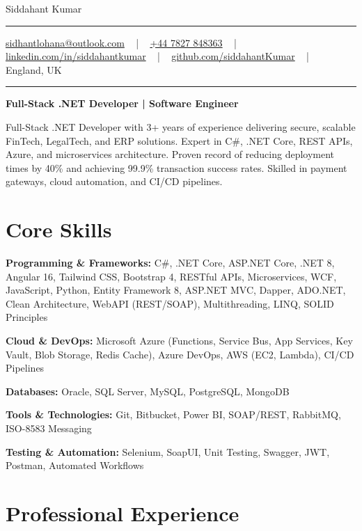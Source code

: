 \documentclass[letterpaper,10pt]{article}
\newcommand{\documentTitle}[2]{
  \begin{center}
    \vspace*{-0.3in}
    {\Huge\color{accentTitle} #1}
    \vspace{8pt}
    {\color{accentLine} \hrule}
    \vspace{2pt}
    \footnotesize{#2}
    \vspace{2pt}
    {\color{accentLine} \hrule}
  \end{center}
}
\newenvironment{resume_list}{
  \vspace{-7pt}
  \begin{itemize}[itemsep=-2px, parsep=1pt, leftmargin=30pt]
}{
  \end{itemize}
}
\begin{document}
\documentTitle{Siddahant Kumar}{
\vspace{0.1cm}
\href{mailto:sidhantlohana@outlook.com}{sidhantlohana@outlook.com} ~ | ~
\href{tel:+447827848363}{+44 7827 848363} ~ | ~
\href{https://www.linkedin.com/in/siddahantkumar/}{linkedin.com/in/siddahantkumar} ~ | ~
\href{https://github.com/siddahantKumar}{github.com/siddahantKumar} ~ | ~
England, UK
}

\begin{center}
\textbf{Full-Stack .NET Developer | Software Engineer}
\end{center}

Full-Stack .NET Developer with 3+ years of experience delivering secure, scalable FinTech, LegalTech, and ERP solutions. Expert in C\#, .NET Core, REST APIs, Azure, and microservices architecture. Proven record of reducing deployment times by 40\% and achieving 99.9\% transaction success rates. Skilled in payment gateways, cloud automation, and CI/CD pipelines.


\section{Core Skills}

\begin{resume_list}
    \item \textbf{Programming \& Frameworks:} C\#, .NET Core, ASP.NET Core, .NET 8, Angular 16, Tailwind CSS, Bootstrap 4, RESTful APIs, Microservices, WCF, JavaScript, Python, Entity Framework 8, ASP.NET MVC, Dapper, ADO.NET, Clean Architecture, WebAPI (REST/SOAP), Multithreading, LINQ, SOLID Principles
    \item \textbf{Cloud \& DevOps:} Microsoft Azure (Functions, Service Bus, App Services, Key Vault, Blob Storage, Redis Cache), Azure DevOps, AWS (EC2, Lambda), CI/CD Pipelines
    \item \textbf{Databases:} Oracle, SQL Server, MySQL, PostgreSQL, MongoDB
    \item \textbf{Tools \& Technologies:} Git, Bitbucket, Power BI, SOAP/REST, RabbitMQ, ISO-8583 Messaging
    \item \textbf{Testing \& Automation:} Selenium, SoapUI, Unit Testing, Swagger, JWT, Postman, Automated Workflows
\end{resume_list}

\section{Professional Experience}
\end{document}
